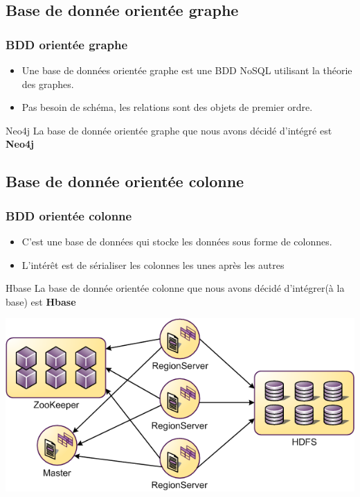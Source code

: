 \documentclass[12pt]{beamer}
\begin{document}
\subsection{Base de donnée orientée graphe}

\begin{frame}
\frametitle{BDD orientée graphe}
\begin{itemize}
\item Une base de données orientée graphe est une BDD NoSQL utilisant la théorie des graphes.
\item Pas besoin de schéma, les relations sont des objets de premier ordre.
\end{itemize}

\begin{block}{Neo4j}
La base de donnée orientée graphe que nous avons décidé d'intégré est \textbf{Neo4j}
\end{block}



\end{frame}
\subsection{Base de donnée orientée colonne}
\begin{frame}
\frametitle{BDD orientée colonne}
\begin{itemize}
\item C'est une base de données qui stocke les données sous forme de colonnes.
\item L'intérêt est de sérialiser les colonnes les unes après les autres
\end{itemize}

\begin{block}{Hbase}
La base de donnée orientée colonne que nous avons décidé d'intégrer(à la base) est \textbf{Hbase}
\end{block}
\begin{center}
\includegraphics[scale=0.3]{hbase-shema.png} 

\label{fig_hbase}
\end{center}

\end{frame}
\end{document}
